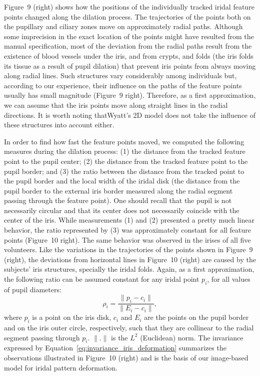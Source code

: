 \documentclass{acmtog}
\begin{document}
Figure~9 (right) shows how the positions of the individually tracked iridal feature points changed along the dilation process. The trajectories of the points both on the pupillary and ciliary zones move on approximately radial paths. Although some imprecision in the exact location of the points might have resulted from the manual specification, most of the deviation from the radial paths result from the existence of blood vessels under the iris, and from crypts, and folds (the iris folds its tissue as a result of pupil dilation) that prevent iris points from always moving along radial lines. 
Such structures vary considerably among individuals but, according to our experience, their influence on the paths of the feature points usually
has small magnitude (Figure~9 right).  Therefore, as a first approximation, we can
assume that the iris points move along straight lines in the radial directions. It is worth noting that\break Wyatt's 2D
model does not take the influence of these structures into account either.

In order to find how fast the feature points moved, we computed the following measures during the dilation process: (1)
the distance from the tracked feature point to the pupil center; (2) the distance from the tracked feature point to the
pupil border; and (3) the ratio between the distance from the tracked point to the pupil border and the local width of
the iridal disk (the distance from the pupil border to the external iris border measured along the radial
segment passing through the feature point). One should recall that the pupil is not necessarily circular and that its
center does not necessarily coincide with the center of the iris. While measurements (1) and (2) presented a pretty much
linear behavior, the ratio represented by (3) was approximately constant for all feature points
(Figure~10 right). The same behavior was observed in the irises of all five volunteers.
Like the variations in the trajectories of the points shown in Figure~9 (right), the
deviations from horizontal lines in Figure~10 (right) are caused by the subjects' iris
structures, specially the iridal folds. Again, as a first approximation, the following ratio can be assumed constant for
any iridal point $p_i$, for all values of pupil diameters: 
\begin{equation}
\rho_i = \frac{\|p_i - c_i\|}{\|E_i - c_i\|}, 
\label{eq:invariance_iris_deformation}
\end{equation} 
where $p_i$ is a point on the iris disk, $c_i$ and $E_i$ are the points on the pupil border and on the iris outer circle,
respectively, such that they are collinear to the radial segment passing through $p_i$. $\|.\|$ is the $L^2$ (Euclidean)
norm. The invariance expressed by Equation~\ref{eq:invariance_iris_deformation} summarizes the observations illustrated in
Figure~10 (right) and is the basis of our image-based model for iridal pattern
deformation.    
\end{document}
